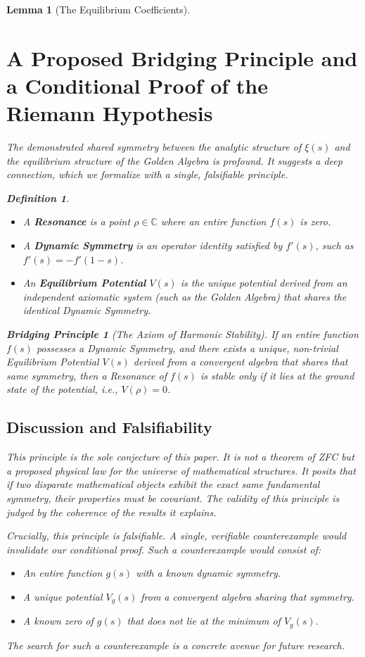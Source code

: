 \documentclass{article}
\theoremstyle{plain}
\newtheorem{lemma}[theorem]{Lemma}
\theoremstyle{definition}
\newtheorem{definition}[theorem]{Definition}
\newtheorem{conjecture}{Bridging Principle}
\theoremstyle{remark}
\begin{document}
\begin{lemma}[The Equilibrium Coefficients]
\section{A Proposed Bridging Principle and a Conditional Proof of the Riemann Hypothesis}
The demonstrated shared symmetry between the analytic structure of $\xi(s)$ and the equilibrium structure of the Golden Algebra is profound. It suggests a deep connection, which we formalize with a single, falsifiable principle.

\begin{definition}
\begin{itemize}
    \item A \textbf{Resonance} is a point $\rho \in \mathbb{C}$ where an entire function $f(s)$ is zero.
    \item A \textbf{Dynamic Symmetry} is an operator identity satisfied by $f'(s)$, such as $f'(s) = -f'(1-s)$.
    \item An \textbf{Equilibrium Potential} $V(s)$ is the unique potential derived from an independent axiomatic system (such as the Golden Algebra) that shares the identical Dynamic Symmetry.
\end{itemize}
\end{definition}

\begin{conjecture}[The Axiom of Harmonic Stability]
If an entire function $f(s)$ possesses a Dynamic Symmetry, and there exists a unique, non-trivial Equilibrium Potential $V(s)$ derived from a convergent algebra that shares that same symmetry, then a Resonance of $f(s)$ is stable only if it lies at the ground state of the potential, i.e., $V(\rho)=0$.
\end{conjecture}

\subsection{Discussion and Falsifiability}
This principle is the sole conjecture of this paper. It is not a theorem of ZFC but a proposed physical law for the universe of mathematical structures. It posits that if two disparate mathematical objects exhibit the exact same fundamental symmetry, their properties must be covariant. The validity of this principle is judged by the coherence of the results it explains.

Crucially, this principle is falsifiable. A single, verifiable counterexample would invalidate our conditional proof. Such a counterexample would consist of:
\begin{itemize}
    \item An entire function $g(s)$ with a known dynamic symmetry.
    \item A unique potential $V_g(s)$ from a convergent algebra sharing that symmetry.
    \item A known zero of $g(s)$ that does not lie at the minimum of $V_g(s)$.
\end{itemize}
The search for such a counterexample is a concrete avenue for future research.


\end{lemma}
\end{document}
